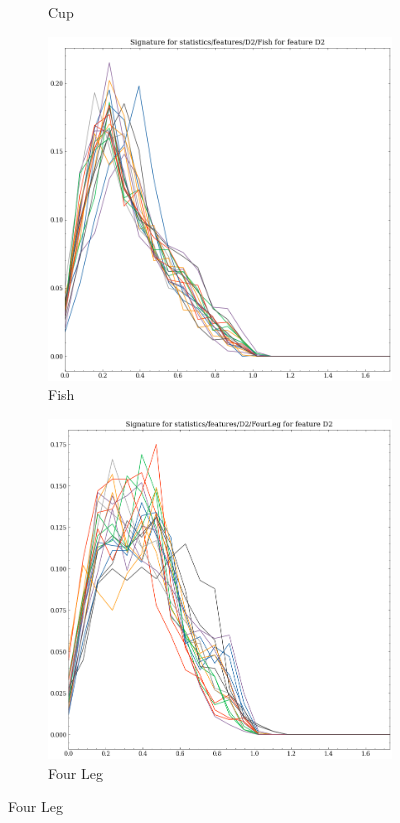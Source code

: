 \begin{figure}[t!p]
\begin{subfigure}[b]{0.23\textwidth}
        \caption{Cup}
    \end{subfigure}
    \hfill
    \begin{subfigure}[b]{0.23\textwidth}
        \includegraphics[width=\textwidth]{assets/feature_extraction/D2/Fish.png}
        \caption{Fish}
    \end{subfigure}
    \hfill
    \begin{subfigure}[b]{0.23\textwidth}
        \includegraphics[width=\textwidth]{assets/feature_extraction/D2/FourLeg.png}
        \caption{Four Leg}
    \end{subfigure}
    \hfill


\end{figure}
